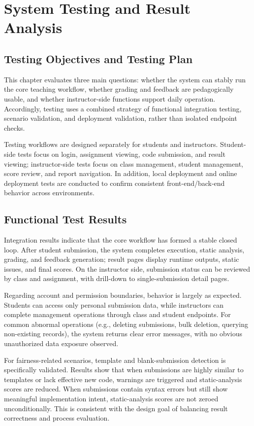 ﻿\chapter{System Testing and Result Analysis}


\section{Testing Objectives and Testing Plan}

This chapter evaluates three main questions: whether the system can stably run the core teaching workflow, whether grading and feedback are pedagogically usable, and whether instructor-side functions support daily operation. Accordingly, testing uses a combined strategy of functional integration testing, scenario validation, and deployment validation, rather than isolated endpoint checks.

Testing workflows are designed separately for students and instructors. Student-side tests focus on login, assignment viewing, code submission, and result viewing; instructor-side tests focus on class management, student management, score review, and report navigation. In addition, local deployment and online deployment tests are conducted to confirm consistent front-end/back-end behavior across environments.

\section{Functional Test Results}

Integration results indicate that the core workflow has formed a stable closed loop. After student submission, the system completes execution, static analysis, grading, and feedback generation; result pages display runtime outputs, static issues, and final scores. On the instructor side, submission status can be reviewed by class and assignment, with drill-down to single-submission detail pages.

Regarding account and permission boundaries, behavior is largely as expected. Students can access only personal submission data, while instructors can complete management operations through class and student endpoints. For common abnormal operations (e.g., deleting submissions, bulk deletion, querying non-existing records), the system returns clear error messages, with no obvious unauthorized data exposure observed.

For fairness-related scenarios, template and blank-submission detection is specifically validated. Results show that when submissions are highly similar to templates or lack effective new code, warnings are triggered and static-analysis scores are reduced. When submissions contain syntax errors but still show meaningful implementation intent, static-analysis scores are not zeroed unconditionally. This is consistent with the design goal of balancing result correctness and process evaluation.

